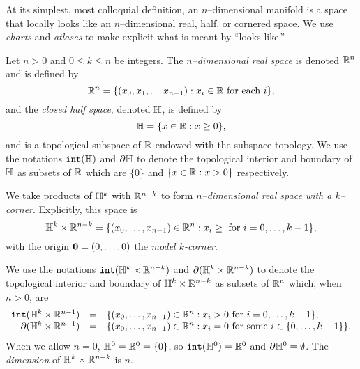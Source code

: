 At its simplest, most colloquial definition, an $n$--dimensional manifold is a space that locally looks like an $n$--dimensional real, half, or cornered space.
We use \emph{charts} and \emph{atlases} to make explicit what is meant by ``looks like.''

%
%

\begin{defn}
	Let $n>0$ and $0\leq k\leq n$ be integers.
	The \emph{$n$--dimensional real space} is denoted $\mathbb{R}^n$ and is defined by
	\[
		\mathbb{R}^n=\{(x_0,x_1,\dots x_{n-1}):x_i\in\mathbb{R}\textrm{ for each }i\},
	\]
	and the \emph{closed half space}, denoted $\mathbb{H}$, is defined by
	\[
		\mathbb{H}=\{x\in\mathbb{R}:x\geq 0\},
	\]
	and is a topological subspace of $\mathbb{R}$ endowed with the subspace topology.
	We use the notations $\mathtt{int}(\mathbb{H})$ and $\partial \mathbb{H}$ to denote the topological interior and boundary of $\mathbb{H}$ as subsets of $\mathbb{R}$ which are $\{0\}$ and $\{x\in\mathbb{R}:x>0\}$ respectively.
	
	We take products of $\mathbb{H}^k$ with $\mathbb{R}^{n-k}$ to form \emph{$n$--dimensional real space with a $k$--corner}.
	Explicitly, this space is
	\[
		\mathbb{H}^k\times\mathbb{R}^{n-k} = \{(x_0,\dots,x_{n-1})\in\mathbb{R}^n:x_i\geq\textrm{ for } i=0,\dots,k-1\},
	\]
	with the origin $\mathbf{0}=(0,\dots,0)$ the \emph{model $k$-corner}.
	
	We use the notations $\mathtt{int}(\mathbb{H}^k\times\mathbb{R}^{n-k})$ and $\partial (\mathbb{H}^k\times\mathbb{R}^{n-k})$ to denote the topological interior and boundary of $\mathbb{H}^k\times\mathbb{R}^{n-k}$ as subsets of $\mathbb{R}^n$ which, when $n>0$, are
	\[
	\begin{array}{rcl}
	\mathtt{int}(\mathbb{H}^k\times\mathbb{R}^{n-1}) & = & \{(x_0,\dots,x_{n-1})\in\mathbb{R}^n : x_i > 0\textrm{ for }i=0,\dots,k-1\},\\
	\partial (\mathbb{H}^k\times\mathbb{R}^{n-1})	& = & \{(x_0,\dots,x_{n-1})\in\mathbb{R}^n : x_i = 0\textrm{ for some }i\in\{0,\dots,k-1\}\}.
	\end{array}
	\]
	When we allow $n=0$, $\mathbb{H}^0 = \mathbb{R}^0 = \{0\}$, so $\mathtt{int}(\mathbb{H}^0)=\mathbb{R}^0$ and $\partial\mathbb{H}^0=\emptyset$.
	The \emph{dimension} of $\mathbb{H}^k\times\mathbb{R}^{n-k}$ is $n$.
\end{defn}

